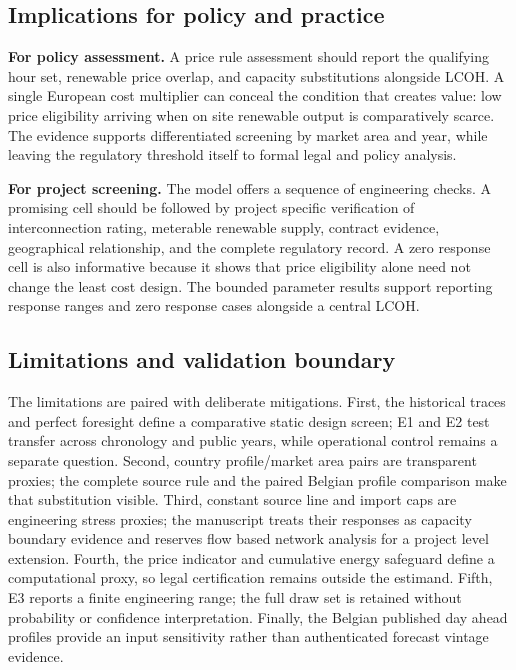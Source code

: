 \documentclass[largeformat]{interact}
\begin{document}
\subsection{Implications for policy and
practice}\label{implications-for-policy-and-practice}

\textbf{For policy assessment.} A price rule assessment should report
the qualifying hour set, renewable price overlap, and capacity
substitutions alongside LCOH. A single European cost multiplier can
conceal the condition that creates value: low price eligibility arriving
when on site renewable output is comparatively scarce. The evidence
supports differentiated screening by market area and year, while leaving
the regulatory threshold itself to formal legal and policy analysis.

\textbf{For project screening.} The model offers a sequence of
engineering checks. A promising cell should be followed by project
specific verification of interconnection rating, meterable renewable
supply, contract evidence, geographical relationship, and the complete
regulatory record. A zero response cell is also informative because it
shows that price eligibility alone need not change the least cost
design. The bounded parameter results support reporting response ranges
and zero response cases alongside a central LCOH.

\subsection{Limitations and validation
boundary}\label{limitations-and-validation-boundary}

The limitations are paired with deliberate mitigations. First, the
historical traces and perfect foresight define a comparative static
design screen; E1 and E2 test transfer across chronology and public
years, while operational control remains a separate question. Second,
country profile/market area pairs are transparent proxies; the complete
source rule and the paired Belgian profile comparison make that
substitution visible. Third, constant source line and import caps are
engineering stress proxies; the manuscript treats their responses as
capacity boundary evidence and reserves flow based network analysis for
a project level extension. Fourth, the price indicator and cumulative
energy safeguard define a computational proxy, so legal certification
remains outside the estimand. Fifth, E3 reports a finite engineering
range; the full draw set is retained without probability or confidence
interpretation. Finally, the Belgian published day ahead profiles
provide an input sensitivity rather than authenticated forecast vintage
evidence.
\end{document}
